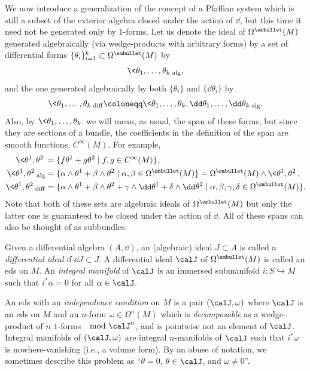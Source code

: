 We now introduce a generalization of the concept of a Pfaffian system which is still a subset of the exterior algebra closed under the action of $\dd$, but this time it need not be generated only by $1$-forms. Let us denote the ideal of $\Omega^{\smbullet}(M)$ generated algebraically (via wedge-products with arbitrary forms) by a set of differential forms $\{\theta_i\}_{i=1}^k\subset \Omega^{\smbullet }(M)$ by 
\[\<\theta_1,\ldots,\theta_k\>_{\mathrm{alg}},\]
and the one generated algebraically by both $\{\theta_i\}$ and $\{\dd\theta_i\}$ by 
\[\<\theta_1,\ldots,\theta_k\>_{\mathrm{diff}}\coloneqq \<\theta_1,\ldots,\theta_k,\dd\theta_1,\ldots,\dd\theta_k\>_{\mathrm{alg}}.\]
Also, by $\<\theta_1,\ldots,\theta_k\>$ we will mean, as usual, the span of these forms, but since they are sections of a bundle, the coefficients in the definition of the span are smooth functions, $C^\infty(M)$. For example, 
\begin{align}
    \<\theta^1,\theta^2\>&=\{f\theta^1+g\theta^2\mid f,g\in C^\infty(M)\},\\
    \<\theta^1,\theta^2\>_{\mathrm{alg}}&=\{\alpha\wedge\theta^1+\beta\wedge\theta^2\mid \alpha,\beta\in\Omega^{\smbullet }(M)\}=\Omega^{\smbullet}(M)\wedge\<\theta^1,\theta^2\>,\\
    \<\theta^1,\theta^2\>_{\mathrm{diff}}&=\{\alpha\wedge\theta^1+\beta\wedge\theta^2+\gamma\wedge\dd\theta^1+\delta\wedge\dd\theta^2\mid \alpha,\beta,\gamma,\delta\in\Omega^{\smbullet }(M)\}.
\end{align}
Note that both of these sets are algebraic ideals of $\Omega^{\smbullet }(M)$ but only the latter one is guaranteed to be closed under the action of $\dd$. All of these spans can also be thought of as subbundles. 

\begin{defn}
    Given a differential algebra $(A,\dd)$, an (algebraic) ideal $J\subset A$ is called a \emph{differential ideal} if $\dd J\subset J$.
    A differential ideal $\calJ$ of $\Omega^{\smbullet }(M)$ is called an \gls{eds} on $M$. An \emph{integral manifold} of $\calJ$ is an immersed submanifold $i:S\hookrightarrow M$ such that $i^\ast\alpha=0$ for all $\alpha\in \calJ$. 

    An \gls{eds} with an \emph{independence condition} on $M$ is a pair $(\calJ,\omega)$ where $\calJ$ is an \gls{eds} on $M$ and an $n$-form $\omega\in\Omega^n (M)$ which is \emph{decomposable} as a wedge-product of $n$ $1$-forms $\mod \calJ^n$, and is pointwise not an element of $\calJ$. Integral manifolds of $(\calJ,\omega)$ are integral $n$-manifolds of $\calJ$ such that $i^\ast \omega$ is nowhere-vanishing (i.e., a volume form). By an abuse of notation, we sometimes describe this problem as ``$\theta=0$, $\theta\in \calJ$, and $\omega\neq 0$''.
\end{defn}

